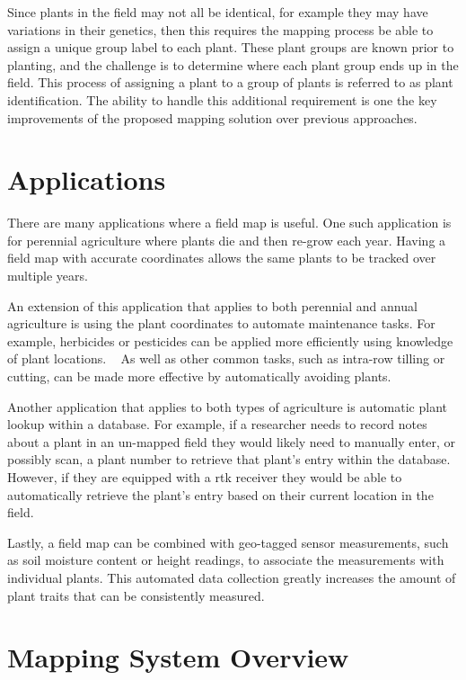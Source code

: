 Since plants in the field may not all be identical, for example they may have variations in their genetics, then this requires the mapping process be able to assign a unique group label to each plant.  These plant groups are known prior to planting, and the challenge is to determine where each plant group ends up in the field.  This process of assigning a plant to a group of plants is referred to as plant identification. The ability to handle this additional requirement is one the key improvements of the proposed mapping solution over previous approaches.

\section{Applications}

There are many applications where a field map is useful.  One such application is for perennial agriculture where plants die and then re-grow each year.  Having a field map with accurate coordinates allows the same plants to be tracked over multiple years.

An extension of this application that applies to both perennial and annual agriculture is using the plant coordinates to automate maintenance tasks.  For example, herbicides or pesticides can be applied more efficiently using knowledge of plant locations. ~\citep{Carballido:2013} As well as other common tasks, such as intra-row tilling or cutting, can be made more effective by automatically avoiding plants. ~\citep{Bakker:2010}  

Another application that applies to both types of agriculture is automatic plant lookup within a database.  For example, if a researcher needs to record notes about a plant in an un-mapped field they would likely need to manually enter, or possibly scan, a plant number to retrieve that plant's entry within the database.  However, if they are equipped with a \ac{rtk} receiver they would be able to automatically retrieve the plant's entry based on their current location in the field. 

Lastly, a field map can be combined with geo-tagged sensor measurements, such as soil moisture content or height readings, to associate the measurements with individual plants.  This automated data collection greatly increases the amount of plant traits that can be consistently measured. ~\citep{Ruckelshausen:2009}

\section{Mapping System Overview} 

